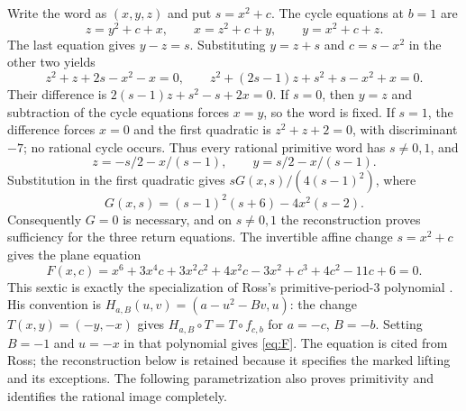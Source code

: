 \documentclass{jT}
\begin{document}
Write the word as $(x,y,z)$ and put $s=x^2+c$. The cycle equations at $b=1$ are
\[
z=y^2+c+x,\qquad x=z^2+c+y,\qquad y=x^2+c+z.
\]
The last equation gives $y-z=s$. Substituting $y=z+s$ and $c=s-x^2$ in the other two yields
\[
z^2+z+2s-x^2-x=0,\qquad
z^2+(2s-1)z+s^2+s-x^2+x=0.
\]
Their difference is $2(s-1)z+s^2-s+2x=0$. If $s=0$, then $y=z$ and subtraction of the cycle equations forces $x=y$, so the word is fixed. If $s=1$, the difference forces $x=0$ and the first quadratic is $z^2+z+2=0$, with discriminant $-7$; no rational cycle occurs. Thus every rational primitive word has $s\ne0,1$, and
\[
z=-s/2-x/(s-1),\qquad y=s/2-x/(s-1).
\]
Substitution in the first quadratic gives $sG(x,s)/(4(s-1)^2)$, where
\begin{equation}\label{eq:G}
G(x,s)=(s-1)^2(s+6)-4x^2(s-2).
\end{equation}
Consequently $G=0$ is necessary, and on $s\ne0,1$ the reconstruction proves sufficiency for the three return equations. The invertible affine change $s=x^2+c$ gives the plane equation
\begin{equation}\label{eq:F}
F(x,c)=x^6+3x^4c+3x^2c^2+4x^2c-3x^2+c^3+4c^2-11c+6=0.
\end{equation}
This sextic is exactly the specialization of Ross's primitive-period-3 polynomial \cite[\S3.1, p.~54]{ross}. His convention is $H_{a,B}(u,v)=(a-u^2-Bv,u)$: the change $T(x,y)=(-y,-x)$ gives $H_{a,B}\circ T=T\circ f_{c,b}$ for $a=-c$, $B=-b$. Setting $B=-1$ and $u=-x$ in that polynomial gives \eqref{eq:F}. The equation is cited from Ross; the reconstruction below is retained because it specifies the marked lifting and its exceptions. The following parametrization also proves primitivity and identifies the rational image completely.
\end{document}

